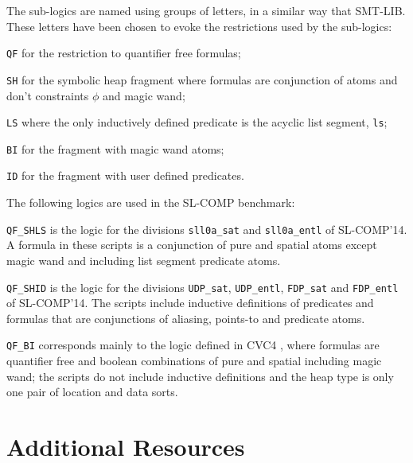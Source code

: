\documentclass[10pt]{llncs}
\begin{document}
The sub-logics are named using groups of letters, in a similar way 
that SMT-LIB. These letters have been chosen to evoke the restrictions 
used by the sub-logics:
\begin{compactitem}
\item {\tt QF} for the restriction to quantifier free formulas;
\item {\tt SH} for the symbolic heap fragment where formulas are conjunction of atoms and don't constraints $\phi$ and magic wand;
\item {\tt LS} where the only inductively defined predicate is the acyclic list segment, {\tt ls};
\item {\tt BI} for the fragment with magic wand atoms;
\item {\tt ID} for the fragment with user defined predicates.
\end{compactitem} 

\medskip
The following logics are used in the SL-COMP benchmark:
\begin{compactitem}
\item {\tt QF\_SHLS} is the logic for the divisions 
{\tt sll0a\_sat} and {\tt sll0a\_entl} of SL-COMP'14. A formula in these scripts is 
a conjunction of pure and spatial atoms except magic wand  and including
list segment predicate atoms.


\item {\tt QF\_SHID} is the logic for the divisions
{\tt UDP\_sat}, {\tt UDP\_entl}, {\tt FDP\_sat} and {\tt FDP\_entl} of SL-COMP'14. 
The scripts include inductive definitions of predicates and
formulas that are conjunctions of aliasing, points-to and predicate atoms.


\item {\tt QF\_BI} corresponds mainly to the logic defined in 
CVC4 \cite{cvc4-seplog}, where formulas are quantifier free and
boolean combinations of pure and spatial including magic wand;
the scripts do not include inductive definitions and the heap
type is only one pair of location and data sorts.

\end{compactitem} 




\section{Additional Resources}
\end{document}

